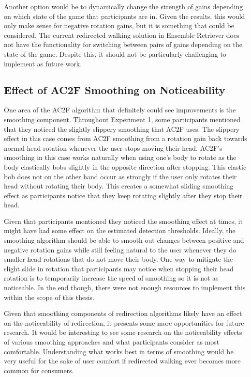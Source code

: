 Another option would be to dynamically change the strength of gains depending on which state of the game that participants are in. Given the results, this would only make sense for negative rotation gains, but it is something that could be considered. The current redirected walking solution in Ensemble Retriever does not have the functionality for switching between pairs of gains depending on the state of the game. Despite this, it should not be particularly challenging to implement as future work.

\subsection{Effect of AC2F Smoothing on Noticeability}
One area of the AC2F algorithm that definitely could see improvements is the smoothing component. Throughout Experiment 1, some participants mentioned that they noticed the slightly slippery smoothing that AC2F uses. The slippery effect in this case comes from AC2F smoothing from a rotation gain back towards normal head rotation whenever the user stops moving their head. AC2F's smoothing in this case works naturally when using one's body to rotate as the body elastically bobs slightly in the opposite direction after stopping. This elastic bob does not on the other hand occur as strongly if the user only rotates their head without rotating their body. This creates a somewhat sliding smoothing effect as participants notice that they keep rotating slightly after they stop their head. 

Given that participants mentioned they noticed the smoothing effect at times, it might have had some effect on the estimated detection thresholds. Ideally, the smoothing algorithm should be able to smooth out changes between positive and negative rotation gains while still feeling natural to the user whenever they do smaller head rotations that do not move their body. One way to mitigate the slight slide in rotation that participants may notice when stopping their head rotation is to temporarily increase the speed of smoothing so it is not as noticeable. In the end though, there were not enough resources to implement this within the scope of this thesis. 

Given that smoothing components of redirection algorithms likely have an effect on the noticeability of redirection, it presents some more opportunities for future research. It would be interesting to see some research on the noticeability effects of various smoothing approaches and what participants consider as most comfortable. Understanding what works best in terms of smoothing would be very useful for the sake of user comfort if redirected walking ever becomes more common for consumers. 

